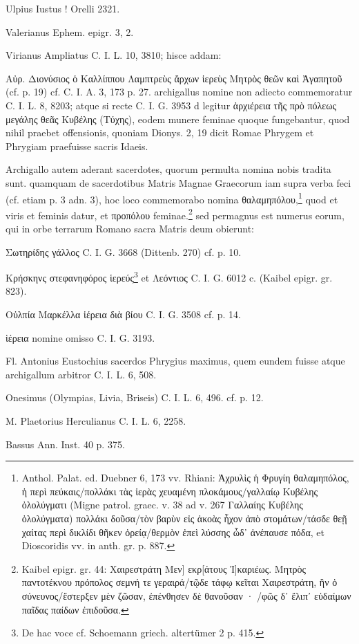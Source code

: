 \documentclass[a4paper, 11pt, oneside, polutonikogreek, german]{article}
\begin{document}
Ulpius Iustus ! Orelli 2321.

Valerianus Ephem. epigr. 3, 2.

Virianus Ampliatus C. I. L. 10, 3810; hisce addam:

Αὐρ. Διονύσιος ὁ Καλλίππου Λαμπτρεὺς ἄρχων ἱερεὺς Μητρὸς θεῶν καὶ Ἀγαπητοῦ (cf. p. 19) cf. C. I. A. 3, 173 p. 27. archigallus nomine non adiecto commemoratur C. I. L. 8, 8203; atque si recte C. I. G. 3953 d legitur ἀρχιέρεια τῆς πρὸ πόλεως μεγάλης θεᾶς Κυβέλης (Τύχης), eodem munere feminae quoque fungebantur, quod nihil praebet offensionis, quoniam Dionys. 2, 19 dicit Romae Phrygem et Phrygiam praefuisse sacris Idaeis.

Archigallo autem aderant sacerdotes, quorum permulta nomina nobis tradita sunt. quamquam de sacerdotibus Matris Magnae Graecorum iam supra verba feci (cf. etiam p. 3 adn. 3), hoc loco commemorabo nomina θαλαμηπόλου,\footnote{Anthol. Palat. ed. Duebner 6, 173 vv. Rhiani: Ἀχρυλὶς ἡ Φρυγίη θαλαμηπόλος, ἡ περὶ πεύκαις/πολλάκι τὰς ἱερὰς χευαμένη πλοκάμους/γαλλαίῳ Κυβέλης ὀλολύγματι (Migne patrol. graec. v. 38 ad v. 267 Γαλλαίης Κυβέλης ὀλολύγματα) πολλάκι δοῦσα/τὸν βαρὺν εἰς ἀκοὰς ἦχον ἀπὸ στομάτων/τάσδε θεῇ χαίτας περὶ δικλίδι θῆκεν ὀρείᾳ/θερμὸν ἐπεὶ λύσσης ὧδ᾽ ἀνέπαυσε πόδα, et Dioscoridis vv. in anth. gr. p. 887.} quod et viris et feminis datur, et προπόλου feminae.\footnote{Kaibel epigr. gr. 44: Χαιρεστράτη Μεν] εκρ[άτους Ἰ]καριέως. Μητρὸς παντοτέκνου πρόπολος σεμνή τε γεραιρά/τῷδε τάφῳ κεῖται Χαιρεστράτη, ἣν ὁ σύνευνος/ἔστερξεν μὲν ζῶσαν, ἐπένθησεν δὲ θανοῦσαν · /φῶς δ᾽ ἔλιπ᾽ εὐδαίμων παῖδας παίδων ἐπιδοῦσα.} sed permagnus est numerus eorum, qui in orbe terrarum Romano sacra Matris deum obierunt:

Σωτηρίδης γάλλος C. I. G. 3668 (Dittenb. 270) cf. p. 10.

Κρήσκηνς στεφανηφόρος ἱερεύς\footnote{De hac voce cf. Schoemann griech. altertümer 2 p. 415.} et Λεόντιος C. I. G. 6012 c. (Kaibel epigr. gr. 823).

Οὐλπία Μαρκέλλα ἱέρεια διὰ βίου C. I. G. 3508 cf. p. 14.

ἱέρεια nomine omisso C. I. G. 3193.

Fl. Antonius Eustochius sacerdos Phrygius maximus, quem eundem fuisse atque archigallum arbitror C. I. L. 6, 508.

Onesimus (Olympias, Livia, Briseis) C. I. L. 6, 496. cf. p. 12.

M. Plaetorius Herculianus C. I. L. 6, 2258.

Bassus Ann. Inst. 40 p. 375.
\end{document}
